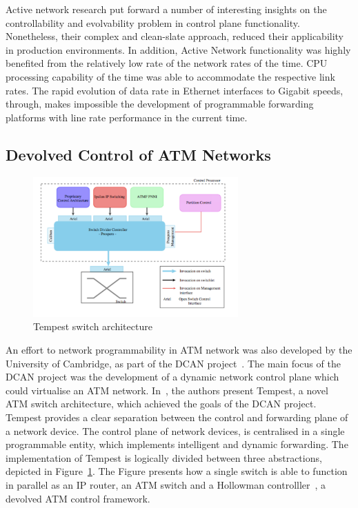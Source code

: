 Active network research put forward a number of interesting insights on the
controllability and evolvability problem in control plane functionality.
Nonetheless, their complex and clean-slate approach, reduced their applicability
in production environments. In addition, Active Network functionality was highly
benefited from the relatively low rate of the network rates of the time. CPU
processing capability of the time was able to accommodate the respective link
rates. The rapid evolution of data rate in Ethernet interfaces to Gigabit
speeds, through, makes impossible the development of programmable forwarding
platforms with line rate performance in the current time. 

\subsection{Devolved Control of ATM Networks}

\begin{figure}
  \begin{center}
\includegraphics[width=0.7\textwidth]{Background/BackgroundFigs/tempest_arch}
\caption{Tempest switch architecture~\cite{UCAM-CL-TR-450}}
\label{fig:background:tempest_arch}
\end{center}
\end{figure}

An effort to network programmability in ATM network was also developed by the
University of Cambridge, as part of the DCAN project~\cite{dcan}.  The main
focus of the DCAN project was the development of a dynamic network control plane
which could virtualise an ATM network.  In~\cite{Rooney1998}, the authors
present Tempest, a novel ATM switch architecture, which achieved the goals of
the DCAN project.  Tempest provides a clear separation between the control and
forwarding plane of a network device.  The control plane of network devices, is
centralised in a single programmable entity, which implements intelligent and
dynamic forwarding.  The implementation of Tempest is logically divided between
three abstractions, depicted in Figure~\ref{fig:background:tempest_arch}. The
Figure presents how a single switch is able to function in parallel as an IP
router, an ATM switch and a Hollowman controlller~\cite{Rooney1997}, a devolved
ATM control framework. 

